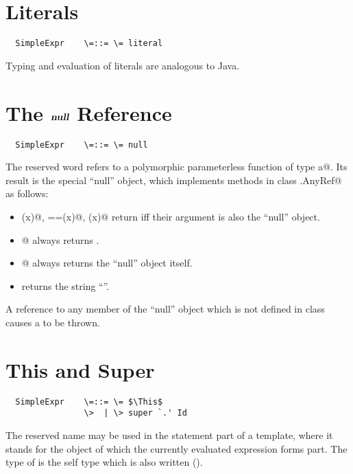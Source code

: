 \documentclass[11pt]{report}
\newcommand{\ifqualified}[1]{}
\begin{document}
\begin{itemize}
\section{Literals}

\syntax\begin{verbatim}
  SimpleExpr    \=::= \= literal
\end{verbatim}

Typing and evaluation of literals are analogous to Java.

\section{The $\mbox{\sl\bfseries null}$ Reference}

\syntax\begin{verbatim}
  SimpleExpr    \=::= \= null
\end{verbatim}

The reserved word \verb@null@ refers to a polymorphic parameterless
function of type a@. Its result is the
special ``null'' object, which implements methods in class
\verb@scala.AnyRef@ as follows:
\begin{itemize}
\item[]
\verb@eq(x)@, \verb@==(x)@, \verb@equals(x)@ return \verb@True@ iff their
argument \verb@x@ is also the ``null'' object.
\item[]
\verb@is[T]@ always returns \verb@False@.
\item[]
\verb@as[T]@ always returns the ``null'' object itself.
\item[]
\verb@toString@ returns the string ``\verb@null@''.
\end{itemize}
A reference to any member of the ``null'' object which is not defined in class
\verb@Object@ causes a \verb@NullPointerException@ to be thrown.

\section{This and Super}
\label{sec:this-super}

\syntax\begin{verbatim}
  SimpleExpr    \=::= \= $\This$
                \>  | \> super `.' Id
\end{verbatim}
\ifqualified{
  Super       \>::= \> $\SUPER$
	      \>  | \> `(' $\SUPER$ `:' Type `)'
}
The reserved name \verb@this@ may be used in the statement part of a
template, where it stands for the object of which the currently
evaluated expression forms part. The type of \verb@this@ is the self
type which is also written \verb@this@ ().


\end{itemize}
\end{document}
